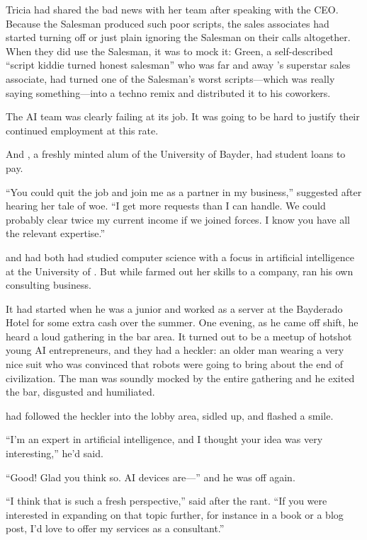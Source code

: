 Tricia had shared the bad news with her team after speaking with the CEO. Because the Salesman produced such poor scripts, the sales associates had started turning off or just plain ignoring the Salesman on their calls altogether. When they did use the Salesman, it was to mock it: {\energyJerk} Green, a self-described ``script kiddie turned honest salesman'' who was far and away  \energyCompany{}'s superstar sales associate, had turned one of the Salesman's worst scripts---which was really saying something---into a techno remix and distributed it to his coworkers.

The AI team was clearly failing at its job. It was going to be hard to justify their continued employment at this rate.

And {\protag}, a freshly minted alum of the University of Bayder, had student loans to pay.

``You could quit the job and join me as a partner in my business,'' {\sidetag} suggested after hearing her tale of woe. ``I get more requests than I can handle. We could probably clear twice my current income if we joined forces. I know you have all the relevant expertise.''

{\protag} and {\sidetag} had both had studied computer science with a focus in artificial intelligence at the University of  {\crunchyCity}. But while {\protag} farmed out her skills to a company, {\sidetag} ran his own consulting business.

It had started when he was a junior and worked as a server at the Bayderado Hotel for some extra cash over the summer. One evening, as he came off shift, he heard a loud gathering in the bar area. It turned out to be a meetup of hotshot young AI entrepreneurs, and they had a heckler: an older man wearing a very nice suit who was convinced that robots were going to bring about the end of civilization. The man was soundly mocked by the entire gathering and he exited the bar, disgusted and humiliated.

{\sidetag} had followed the heckler into the lobby area, sidled up, and flashed a smile.

``I'm an expert in artificial intelligence, and I thought your idea was very interesting,'' he'd said.

``Good! Glad you think so. AI devices are---'' and he was off again.

``I think that is such a fresh perspective,'' {\sidetag} said after the rant. ``If you were interested in expanding on that topic further, for instance in a book or a blog post, I'd love to offer my services as a consultant.''

